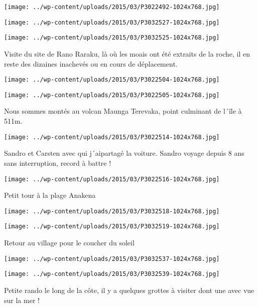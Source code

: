 \centerline{\texttt{[image: ../wp-content/uploads/2015/03/P3022492-1024x768.jpg]} } 
 \newline
 \newline
\centerline{\texttt{[image: ../wp-content/uploads/2015/03/P3032527-1024x768.jpg]} } 
 \newline
\centerline{\texttt{[image: ../wp-content/uploads/2015/03/P3032525-1024x768.jpg]} } 
Visite du site de Rano Raraku, là où les moais ont été extraits de la roche, il en reste des dizaines inachevés ou en cours de déplacement. \newline
 \newline
\centerline{\texttt{[image: ../wp-content/uploads/2015/03/P3022504-1024x768.jpg]} } 
 \newline
\centerline{\texttt{[image: ../wp-content/uploads/2015/03/P3022505-1024x768.jpg]} } 
 \newline
 Nous sommes montés au volcan Maunga Terevaka, point culminant de l´île à 511m. \newline
 \newline
\centerline{\texttt{[image: ../wp-content/uploads/2015/03/P3022514-1024x768.jpg]} } 
 \newline
 Sandro et Carsten avec qui j´aipartagé la voiture. Sandro voyage depuis 8 ans sans interruption, record à battre !\newline
\centerline{\texttt{[image: ../wp-content/uploads/2015/03/P3022516-1024x768.jpg]} } 
Petit tour à la plage Anakena \newline
 \newline
\centerline{\texttt{[image: ../wp-content/uploads/2015/03/P3032518-1024x768.jpg]} } 
 \newline
\centerline{\texttt{[image: ../wp-content/uploads/2015/03/P3032519-1024x768.jpg]} } 
Retour au village pour le coucher du soleil \newline
 \newline
\centerline{\texttt{[image: ../wp-content/uploads/2015/03/P3032537-1024x768.jpg]} } 
 \newline
\centerline{\texttt{[image: ../wp-content/uploads/2015/03/P3032539-1024x768.jpg]} } 
 \newline
 Petite rando le long de la côte, il y a quelques grottes à visiter dont une avec vue sur la mer ! \newline
 \newline
